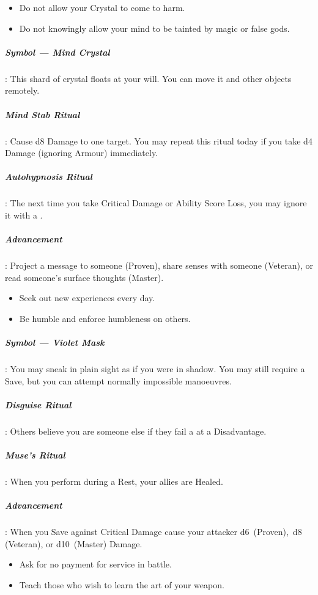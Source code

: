 \documentclass[itdr]{subfiles}
\begin{document}
{\em\begin{itemize}
		\item Do not allow your Crystal to come to harm.
		\item Do not knowingly allow your mind to be tainted by magic or false gods.
\end{itemize}}

\subparagraph{Symbol --- Mind Crystal}: This shard of crystal floats at your will. You can move it and other objects remotely.

\subparagraph{Mind Stab Ritual}: Cause d8 Damage to one target. You may repeat this ritual today if you take d4 Damage (ignoring Armour) immediately.

\subparagraph{Autohypnosis Ritual}: The next time you take Critical Damage or Ability Score Loss, you may ignore it with a .

\subparagraph{Advancement}: Project a message to someone (Proven), share senses with someone (Veteran), or read someone's surface thoughts (Master).

\vfill

{\em\begin{itemize}
		\item Seek out new experiences every day.
		\item Be humble and enforce humbleness on others.
\end{itemize}}

\subparagraph{Symbol --- Violet Mask}: You may sneak in plain sight as if you were in shadow. You may still require a Save, but you can attempt normally impossible manoeuvres.

\subparagraph{Disguise Ritual}: Others believe you are someone else if they fail a  at a Disadvantage.

\subparagraph{Muse's Ritual}: When you perform during a Rest, your allies are Healed.

\subparagraph{Advancement}: When you Save against Critical Damage cause your attacker d6~(Proven),~d8 (Veteran), or d10~(Master) Damage.

\vfill
\break

{\em\begin{itemize}
		\item Ask for no payment for service in battle.
		\item Teach those who wish to learn the art of your weapon.
\end{itemize}}
\end{document}
